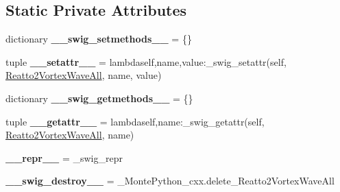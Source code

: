 \subsection*{Static Private Attributes}
\begin{DoxyCompactItemize}
\item 
\hypertarget{classMontePython__cxx_1_1Reatto2VortexWaveAll_a422886c2cfd4a11ccb653caf912f04bf}{}dictionary {\bfseries \+\_\+\+\_\+swig\+\_\+setmethods\+\_\+\+\_\+} = \{\}\label{classMontePython__cxx_1_1Reatto2VortexWaveAll_a422886c2cfd4a11ccb653caf912f04bf}

\item 
\hypertarget{classMontePython__cxx_1_1Reatto2VortexWaveAll_a9cd4f1fb01b562984b14696a4344a76e}{}tuple {\bfseries \+\_\+\+\_\+setattr\+\_\+\+\_\+} = lambdaself,name,value\+:\+\_\+swig\+\_\+setattr(self, \hyperlink{classMontePython__cxx_1_1Reatto2VortexWaveAll}{Reatto2\+Vortex\+Wave\+All}, name, value)\label{classMontePython__cxx_1_1Reatto2VortexWaveAll_a9cd4f1fb01b562984b14696a4344a76e}

\item 
\hypertarget{classMontePython__cxx_1_1Reatto2VortexWaveAll_a55ed15fb6b51c52f9de682463bdacfe9}{}dictionary {\bfseries \+\_\+\+\_\+swig\+\_\+getmethods\+\_\+\+\_\+} = \{\}\label{classMontePython__cxx_1_1Reatto2VortexWaveAll_a55ed15fb6b51c52f9de682463bdacfe9}

\item 
\hypertarget{classMontePython__cxx_1_1Reatto2VortexWaveAll_a4b7f8713a631a0c0873b579279727536}{}tuple {\bfseries \+\_\+\+\_\+getattr\+\_\+\+\_\+} = lambdaself,name\+:\+\_\+swig\+\_\+getattr(self, \hyperlink{classMontePython__cxx_1_1Reatto2VortexWaveAll}{Reatto2\+Vortex\+Wave\+All}, name)\label{classMontePython__cxx_1_1Reatto2VortexWaveAll_a4b7f8713a631a0c0873b579279727536}

\item 
\hypertarget{classMontePython__cxx_1_1Reatto2VortexWaveAll_a77c5b039474dc9157305e954750c9ee0}{}{\bfseries \+\_\+\+\_\+repr\+\_\+\+\_\+} = \+\_\+swig\+\_\+repr\label{classMontePython__cxx_1_1Reatto2VortexWaveAll_a77c5b039474dc9157305e954750c9ee0}

\item 
\hypertarget{classMontePython__cxx_1_1Reatto2VortexWaveAll_ab6c6119cc40dba972bad02bf72e9b825}{}{\bfseries \+\_\+\+\_\+swig\+\_\+destroy\+\_\+\+\_\+} = \+\_\+\+Monte\+Python\+\_\+cxx.\+delete\+\_\+\+Reatto2\+Vortex\+Wave\+All\label{classMontePython__cxx_1_1Reatto2VortexWaveAll_ab6c6119cc40dba972bad02bf72e9b825}

\end{DoxyCompactItemize}


